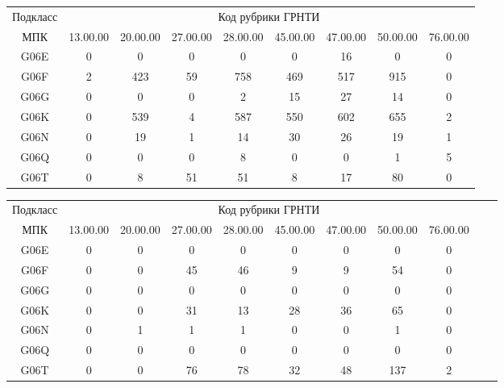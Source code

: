 \begin{multicols}{2}

\begin{table*}\small  %
\begin{center}
      \vspace*{2ex}
      
      \begin{tabular}{|c|c|c|c|c|c|c|c|c|}
      \hline
Подкласс&\multicolumn{8}{c|}{Код рубрики ГРНТИ}\\
\cline{2-9}
МПК&13.00.00&20.00.00&27.00.00&28.00.00&45.00.00&47.00.00&50.00.00&76.00.00\\
\hline
G06E&0&\hphantom{9}0&0&\hphantom{9}0&\hphantom{9}0&16&\hphantom{9}0&0\\
G06F&2&423\hphantom{9}&59\hphantom{9}&758\hphantom{9}&469\hphantom{9}&517\hphantom{9}&915\hphantom{9}&0\\
G06G&0&\hphantom{9}0&0&\hphantom{9}2&15&27&14&0\\
G06K&0&539\hphantom{9}&4&587\hphantom{9}&550\hphantom{9}&602\hphantom{9}&655\hphantom{9}&2\\
G06N&0&19&1&14&30&26&19&1\\
G06Q&0&\hphantom{9}0&0&\hphantom{9}8&\hphantom{9}0&\hphantom{9}0&\hphantom{9}1&5\\
G06T&0&\hphantom{9}8&51\hphantom{9}&51&\hphantom{9}8&17&80&0\\
\hline
     \end{tabular}
     \end{center}
\begin{center}
     \vspace*{2ex}
     
     \tabcolsep=7.5pt
     \begin{tabular}{|c|c|c|c|c|c|c|c|c|c|c}
     \hline
Подкласс &\multicolumn{8}{c|}{Код рубрики ГРНТИ}\\
\cline{2-9}
МПК&13.00.00&20.00.00&27.00.00&28.00.00&45.00.00&47.00.00&50.00.00&76.00.00\\
\hline
G06E&0&0&0&0&0&0&0&0\\
G06F&0&0&45\hphantom{9}&46\hphantom{9}&9&9&54\hphantom{9}&0\\
G06G&0&0&0&0&0&0&0&0\\
G06K&0&0&31\hphantom{9}&13\hphantom{9}&28\hphantom{9}&36\hphantom{9}&65\hphantom{9}&0\\
G06N&0&1&1&1&0&0&1&0\\
G06Q&0&0&0&0&0&0&0&0\\
G06T&0&0&76\hphantom{9}&78\hphantom{9}&32\hphantom{9}&48\hphantom{9}&137\hphantom{99}&2\\
\hline
\end{tabular}
\end{center}
\end{table*}


\end{multicols}
